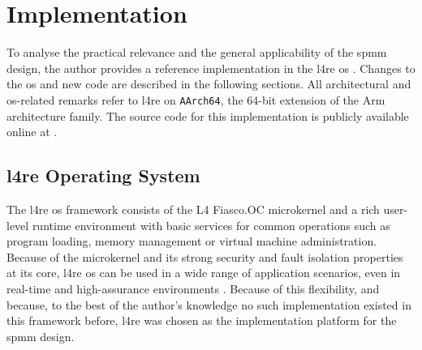 \chapter{Implementation}
\label{chap:implementation}

To analyse the practical relevance and the general applicability of the \ac{spmm} design, the author provides a reference implementation in the \ac{l4re} \ac{os} \cite{l4re}.
Changes to the \ac{os} and new code are described in the following sections.
All architectural and \ac{os}-related remarks refer to \ac{l4re} on \texttt{AArch64}, the 64-bit extension of the Arm architecture family.
The source code for this implementation is publicly available online at \cite{l4re-spm}.

\section{\acs{l4re} Operating System}
\label{sec:l4re-os}

The \ac{l4re} \acl{os} framework consists of the L4 Fiasco.OC microkernel and a rich user-level runtime environment with basic services for common operations such as program loading, memory management or virtual machine administration.
Because of the microkernel and its strong security and fault isolation properties at its core, \ac{l4re} \ac{os} can be used in a wide range of application scenarios, even in real-time and high-assurance environments \cite{l4re-industries}.
Because of this flexibility, and because, to the best of the author's knowledge no such implementation existed in this framework before, \ac{l4re} was chosen as the implementation platform for the \ac{spmm} design.

